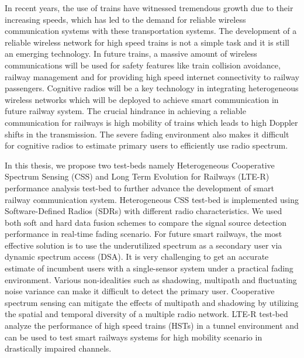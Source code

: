 In recent years, the use of trains have witnessed tremendous growth due to their increasing speeds, which has led to the demand for reliable wireless communication systems with these transportation systems. The development of a reliable wireless network for high speed trains is not a simple task and it is still an emerging technology. In future trains, a massive amount of wireless communications will be used for safety features like train collision avoidance, railway management and for providing high speed internet connectivity to railway passengers. Cognitive radios will be a key technology in integrating heterogeneous wireless networks which will be deployed to achieve smart communication in future railway system. The crucial hindrance in achieving a reliable communication for railways is high mobility of trains which leads to high Doppler shifts in the transmission. The severe fading environment also makes it difficult for cognitive radios to estimate primary users to efficiently use radio spectrum.

In this thesis, we propose two test-beds namely Heterogeneous Cooperative Spectrum Sensing (CSS) and Long Term Evolution for Railways (LTE-R) performance analysis test-bed to further advance the development of smart railway communication system. Heterogeneous CSS test-bed is implemented using Software-Defined Radios (SDRs) with different radio characteristics. We used both soft and hard data fusion schemes to compare the signal source detection performance in real-time fading scenario. For future smart railways, the most effective solution is to use the underutilized spectrum as a secondary user via dynamic spectrum access (DSA). It is very challenging to get an accurate estimate of incumbent users with a single-sensor system under a practical fading environment. Various non-idealities such as shadowing, multipath and fluctuating noise variance can make it difficult to detect the primary user. Cooperative spectrum sensing can mitigate the effects of multipath and shadowing by utilizing the spatial and temporal diversity of a multiple radio network. LTE-R test-bed analyze the performance of high speed trains (HSTs) in a tunnel environment and can be used to test smart railways systems for high mobility scenario in drastically impaired channels.

